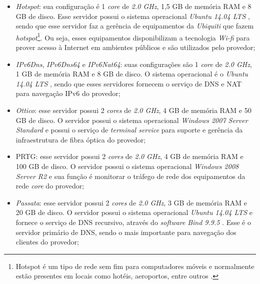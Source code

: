 \begin{itemize}
 \item \textit{Hotspot}: sua configuração é 1 \textit{core} de \textit{2.0 GHz}, 1,5 GB de memória \ac{RAM} e 8 GB de disco. 
 Esse servidor possui o sistema operacional \textit{Ubuntu 14.04 \ac{LTS}} \cite{ubuntu}, sendo que esse servidor faz a gerência de equipamentos 
 da \textit{Ubiquiti} que fazem \textit{hotspot}\footnote[1]{Hotspot é um tipo de rede sem fim para computadores móveis e normalmente estão 
 presentes em locais como hotéis, aeroportos, entre outros \cite{tanenbaum2011}.}. Ou seja, esses equipamentos disponibilizam a tecnologia 
 \textit{Wi-fi} para prover acesso à Internet em ambientes públicos e são utilizados pelo provedor;
 
 \item \textit{IPv6Dns}, \textit{IPv6Dns64} e \textit{IPv6Nat64}: suas configurações são 1 \textit{core} de \textit{2.0 GHz}, 
 1 GB de memória \ac{RAM} e 8 GB de disco. O sistema operacional é o \textit{Ubuntu 14.04 \ac{LTS}} \cite{ubuntu}, sendo que esses servidores 
 fornecem o serviço de \ac{DNS} \cite{tanenbaum2011} e \ac{NAT} \cite{kurose2006} para navegação \ac{IPv6} \cite{ipv6} do provedor;
 
 \item \textit{Ottico}: esse servidor possui 2 \textit{cores} de \textit{2.0 GHz}, 4 GB de memória \ac{RAM} e 50 GB de disco. 
 O servidor possui o sistema operacional \textit{Windows 2007 Server Standard} e possui o serviço de \textit{terminal service} para suporte e 
 gerência da infraestrutura de fibra óptica do provedor;
 
 \item \ac{PRTG}: esse servidor possui 2 \textit{cores} de \textit{2.0 GHz}, 4 GB de memória \ac{RAM} e 100 GB de disco. 
 O servidor possui o sistema operacional \textit{Windows 2008 Server R2} e sua função é monitorar o tráfego de rede dos equipamentos da 
 rede \textit{core} do provedor;
 
 \item \textit{Passata}: esse servidor possui 2 \textit{cores} de \textit{2.0 GHz}, 3 GB de memória \ac{RAM} e 20 GB de disco. 
 O servidor possui o sistema operacional \textit{Ubuntu 14.04 \ac{LTS}} \cite{ubuntu} e fornece o serviço de \ac{DNS} recursivo, através do 
 \textit{software} \textit{Bind 9.9.5} \cite{bind}. Esse é o servidor primário de \ac{DNS}, sendo o mais importante para navegação dos clientes 
 do provedor;
 

\end{itemize}
